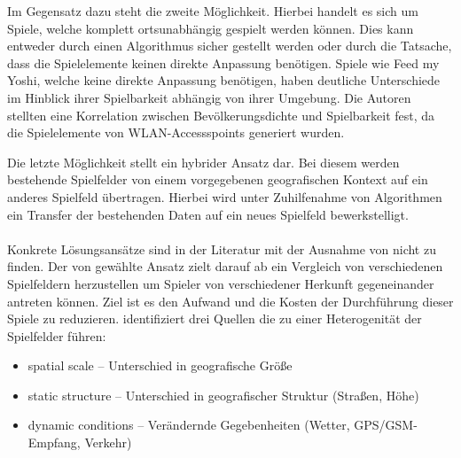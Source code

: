 Im Gegensatz dazu steht die zweite Möglichkeit. Hierbei handelt es sich um Spiele, welche komplett ortsunabhängig gespielt werden können.
Dies kann entweder durch einen Algorithmus sicher gestellt werden oder durch die Tatsache, dass die Spielelemente keinen direkte Anpassung benötigen.
Spiele wie Feed my Yoshi, welche keine direkte Anpassung benötigen, haben deutliche Unterschiede im Hinblick ihrer Spielbarkeit abhängig von ihrer Umgebung. Die Autoren stellten  eine Korrelation zwischen Bevölkerungsdichte und Spielbarkeit fest, da die Spielelemente von WLAN-Accessspoints generiert wurden.\cite{Bell.2006}

Die letzte Möglichkeit stellt ein hybrider Ansatz dar. Bei diesem werden bestehende Spielfelder von einem vorgegebenen geografischen Kontext auf ein anderes Spielfeld übertragen. Hierbei wird unter Zuhilfenahme von Algorithmen ein Transfer der bestehenden Daten auf ein neues Spielfeld bewerkstelligt.
\\\\
Konkrete Lösungsansätze sind in der Literatur mit der Ausnahme von \cite{Kiefer.2007}
nicht zu finden.
Der von \textcite{Kiefer.2007} gewählte Ansatz zielt darauf ab ein Vergleich von verschiedenen Spielfeldern herzustellen um Spieler von verschiedener Herkunft gegeneinander antreten können. Ziel ist es den Aufwand und die Kosten der Durchführung dieser Spiele zu reduzieren. \textcite{Kiefer.2007} identifiziert drei Quellen die zu einer Heterogenität der Spielfelder führen:

\begin{itemize}
\item spatial scale -- Unterschied in geografische Größe
\item static structure -- Unterschied in geografischer Struktur (Straßen, Höhe) 
\item dynamic conditions -- Verändernde Gegebenheiten (Wetter, GPS/GSM-Empfang, Verkehr)
\end{itemize}

